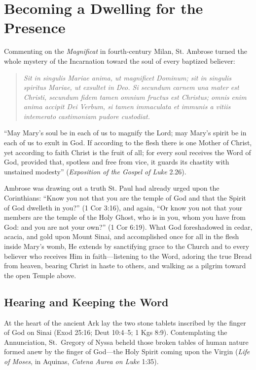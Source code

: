 \section{Becoming a Dwelling for the Presence}\label{sec:interior-dwelling}

Commenting on the \textit{Magnificat} in fourth-century Milan, St. Ambrose turned the whole mystery of the Incarnation toward the soul of every baptized believer:

\begin{quote}\small
\textit{Sit in singulis Mariae anima, ut magnificet Dominum; sit in singulis spiritus Mariae, ut exsultet in Deo. Si secundum carnem una mater est Christi, secundum fidem tamen omnium fructus est Christus; omnis enim anima accipit Dei Verbum, si tamen immaculata et immunis a vitiis intemerato castimoniam pudore custodiat.}
\end{quote}

``May Mary's soul be in each of us to magnify the Lord; may Mary's spirit be in each of us to exult in God. If according to the flesh there is one Mother of Christ, yet according to faith Christ is the fruit of all; for every soul receives the Word of God, provided that, spotless and free from vice, it guards its chastity with unstained modesty'' (\textit{Exposition of the Gospel of Luke} 2.26).

Ambrose was drawing out a truth St. Paul had already urged upon the Corinthians: ``Know you not that you are the temple of God and that the Spirit of God dwelleth in you?'' (1 Cor 3:16), and again, ``Or know you not that your members are the temple of the Holy Ghost, who is in you, whom you have from God: and you are not your own?'' (1 Cor 6:19). What God foreshadowed in cedar, acacia, and gold upon Mount Sinai, and accomplished once for all in the flesh inside Mary's womb, He extends by sanctifying grace to the Church and to every believer who receives Him in faith---listening to the Word, adoring the true Bread from heaven, bearing Christ in haste to others, and walking as a pilgrim toward the open Temple above.

\subsection{Hearing and Keeping the Word}\label{subsec:hearing-keeping-word}

At the heart of the ancient Ark lay the two stone tablets inscribed by the finger of God on Sinai (Exod 25:16; Deut 10:4--5; 1 Kgs 8:9). Contemplating the Annunciation, St.\ Gregory of Nyssa beheld those broken tables of human nature formed anew by the finger of God---the Holy Spirit coming upon the Virgin (\textit{Life of Moses}, in Aquinas, \textit{Catena Aurea on Luke} 1:35).

